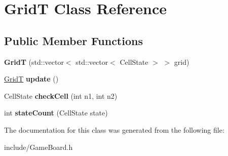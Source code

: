 \hypertarget{class_grid_t}{}\section{GridT Class Reference}
\label{class_grid_t}
\subsection*{Public Member Functions}
\begin{DoxyCompactItemize}
\item 
\mbox{\label{class_grid_t_a11e46798a0233eb52d5f6dcccf489ba6}} 
{\bfseries GridT} (std\+::vector$<$ std\+::vector$<$ Cell\+State $>$ $>$ grid)
\item 
\mbox{\label{class_grid_t_a5cb5c0d6749cbcc5440698e7de982a1e}} 
\hyperlink{class_grid_t}{GridT} {\bfseries update} ()
\item 
\mbox{\label{class_grid_t_ac5cb42530b78cc79ab3135f1231721b5}} 
Cell\+State {\bfseries check\+Cell} (int n1, int n2)
\item 
\mbox{\label{class_grid_t_a0a836865e951ababf05272b1d5d16680}} 
int {\bfseries state\+Count} (Cell\+State state)
\end{DoxyCompactItemize}


The documentation for this class was generated from the following file\+:\begin{DoxyCompactItemize}
\item 
include/Game\+Board.\+h\end{DoxyCompactItemize}
